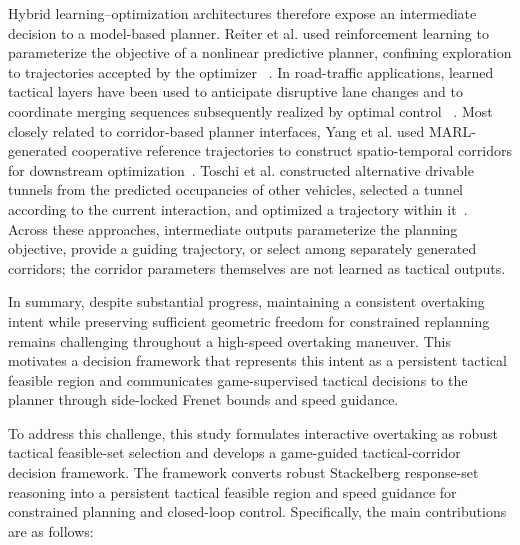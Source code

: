 \documentclass[sensors,article,submit,moreauthors]{Definitions/mdpi}
\begin{document}
Hybrid learning--optimization architectures therefore expose an intermediate
decision to a model-based planner. Reiter et al. used reinforcement learning to
parameterize the objective of a nonlinear predictive planner, confining
exploration to trajectories accepted by the optimizer
~\cite{reiter2023hierarchical}. In road-traffic applications, learned tactical
layers have been used to anticipate disruptive lane changes and to coordinate
merging sequences subsequently realized by optimal control
~\cite{liu2023proactive,muzahid2025merging}. 
Most closely related to corridor-based planner interfaces, Yang et al. used
MARL-generated cooperative reference trajectories to construct spatio-temporal
corridors for downstream optimization~\cite{yang2026corridor}. Toschi et al.
constructed alternative drivable tunnels from the predicted occupancies of
other vehicles, selected a tunnel according to the current interaction, and
optimized a trajectory within it~\cite{toschi2025modular}.
Across these approaches, intermediate outputs parameterize the planning
objective, provide a guiding trajectory, or select among separately generated
corridors; the corridor parameters themselves are not learned as tactical
outputs.

In summary, despite substantial progress, maintaining a consistent overtaking
intent while preserving sufficient geometric freedom for constrained
replanning remains challenging throughout a high-speed overtaking maneuver.
This motivates a decision framework that represents this intent as a persistent
tactical feasible region and communicates game-supervised tactical decisions
to the planner through side-locked Frenet bounds and speed guidance.


To address this challenge, this study formulates interactive overtaking as
robust tactical feasible-set selection and develops a game-guided
tactical-corridor decision framework. The framework converts robust Stackelberg
response-set reasoning into a persistent tactical feasible region and speed
guidance for constrained planning and closed-loop control. Specifically, the
main contributions are as follows:
\end{document}
